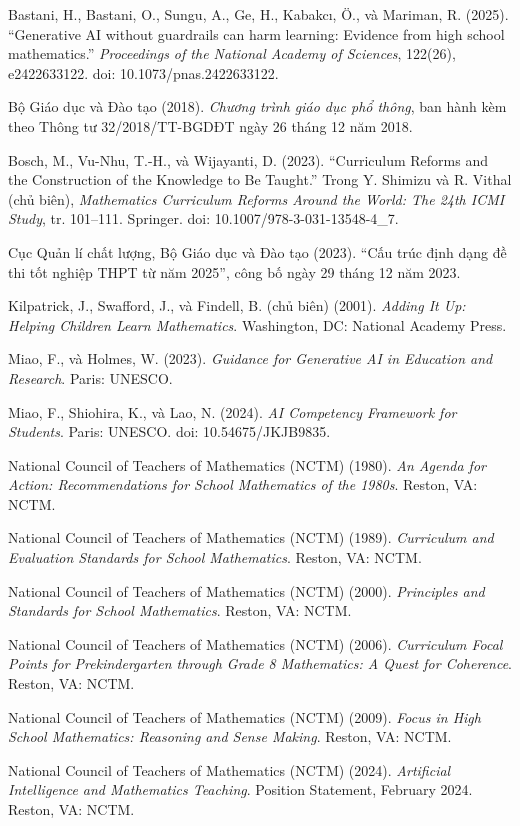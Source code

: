 Bastani, H., Bastani, O., Sungu, A., Ge, H., Kabakcı, Ö., và Mariman, R.
(2025).
``Generative AI without guardrails can harm learning: Evidence from high
school mathematics.''
\emph{Proceedings of the National Academy of Sciences}, 122(26),
e2422633122.
doi: 10.1073/pnas.2422633122.

Bộ Giáo dục và Đào tạo (2018).
\emph{Chương trình giáo dục phổ thông}, ban hành kèm theo Thông tư
32/2018/TT-BGDĐT ngày 26 tháng 12 năm 2018.

Bosch, M., Vu-Nhu, T.-H., và Wijayanti, D. (2023).
``Curriculum Reforms and the Construction of the Knowledge to Be Taught.''
Trong Y. Shimizu và R. Vithal (chủ biên),
\emph{Mathematics Curriculum Reforms Around the World: The 24th ICMI Study},
tr. 101--111. Springer.
doi: 10.1007/978-3-031-13548-4\_7.

Cục Quản lí chất lượng, Bộ Giáo dục và Đào tạo (2023).
``Cấu trúc định dạng đề thi tốt nghiệp THPT từ năm 2025'', công bố ngày
29 tháng 12 năm 2023.

Kilpatrick, J., Swafford, J., và Findell, B. (chủ biên) (2001).
\emph{Adding It Up: Helping Children Learn Mathematics}.
Washington, DC: National Academy Press.

Miao, F., và Holmes, W. (2023).
\emph{Guidance for Generative AI in Education and Research}.
Paris: UNESCO.

Miao, F., Shiohira, K., và Lao, N. (2024).
\emph{AI Competency Framework for Students}.
Paris: UNESCO.
doi: 10.54675/JKJB9835.

National Council of Teachers of Mathematics (NCTM) (1980).
\emph{An Agenda for Action: Recommendations for School Mathematics of the
1980s}. Reston, VA: NCTM.

National Council of Teachers of Mathematics (NCTM) (1989).
\emph{Curriculum and Evaluation Standards for School Mathematics}.
Reston, VA: NCTM.

National Council of Teachers of Mathematics (NCTM) (2000).
\emph{Principles and Standards for School Mathematics}.
Reston, VA: NCTM.

National Council of Teachers of Mathematics (NCTM) (2006).
\emph{Curriculum Focal Points for Prekindergarten through Grade 8
Mathematics: A Quest for Coherence}.
Reston, VA: NCTM.

National Council of Teachers of Mathematics (NCTM) (2009).
\emph{Focus in High School Mathematics: Reasoning and Sense Making}.
Reston, VA: NCTM.

National Council of Teachers of Mathematics (NCTM) (2024).
\emph{Artificial Intelligence and Mathematics Teaching}.
Position Statement, February 2024. Reston, VA: NCTM.


